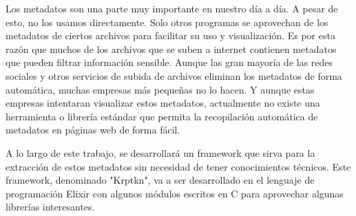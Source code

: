 Los metadatos son una parte muy importante en nuestro día a día. A pesar de esto, no los usamos directamente. Solo otros programas se aprovechan de los metadatos de ciertos archivos para facilitar su uso y visualización. Es por esta razón que muchos de los archivos que se suben a internet contienen metadatos que pueden filtrar información sensible. Aunque las gran mayoría de las redes sociales y otros servicios de subida de archivos eliminan los metadatos de forma automática, muchas empresas más pequeñas no lo hacen. Y aunque estas empresas intentaran visualizar estos metadatos, actualmente no existe una herramienta o librería estándar que permita la recopilación automática de metadatos en páginas web de forma fácil.

A lo largo de este trabajo, se desarrollará un framework que sirva para la extracción de estos metadatos sin necesidad de tener conocimientos técnicos. Este framework, denominado "Krptkn", va a ser desarrollado en el lenguaje de programación Elixir con algunos módulos escritos en C para aprovechar algunas librerías interesantes.

